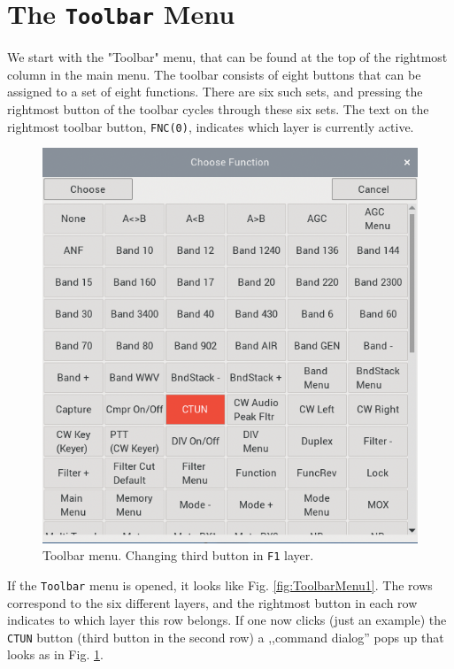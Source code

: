 \documentclass[12pt]{book}
\def\rett#1{\texttt{\color{red}#1}}
\def\bltt#1{\texttt{\color{blue}#1}}
\begin{document}
\section{The \texttt{Toolbar} Menu}
\label{sec:toolbarmenu}
We start with the "Toolbar" menu, that can be found at the top of the rightmost
column in the main menu. The toolbar consists of eight buttons that can be assigned
to a set of eight functions. There are six such sets, and pressing the rightmost button
of the toolbar cycles through these six sets. The text on the rightmost toolbar button, \rett{FNC(0)}, indicates which
layer is currently active.

\begin{figure}[ht!]
\center
\includegraphics[scale=0.45]{ToolbarMenu2.png}
\caption{Toolbar menu. Changing third button in \texttt{F1} layer.}
\label{fig:ToolbarMenu2}
\end{figure}

If the \bltt{Toolbar} menu is opened, it looks like Fig. \ref{fig:ToolbarMenu1}.
The rows correspond to the six different layers, and the rightmost button in each
row indicates to which layer this row belongs.
If one now clicks (just an example)
the \texttt{CTUN} button (third button in the second row) a ,,command dialog'' pops up that looks as
in Fig. \ref{fig:ToolbarMenu2}.
\end{document}
